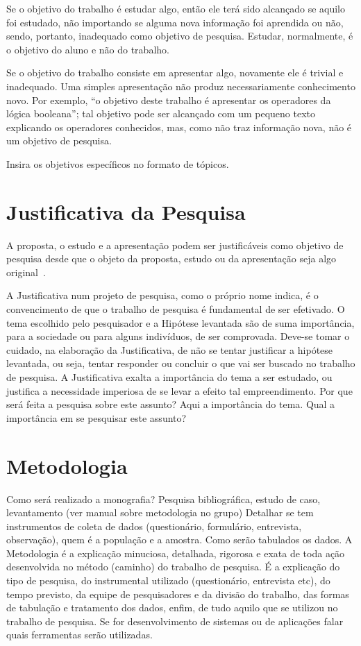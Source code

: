 \documentclass[
	12pt,				    %
	openright,			    %
	oneside,			    %
	a4paper,			    %
    sumario=tradicional,    %
	english,			    %
	brazil,				    %
	]{abntex2}
\begin{document}
Se o objetivo do trabalho é estudar algo, então ele terá sido alcançado se aquilo foi estudado, não importando se alguma nova informação foi aprendida ou não, sendo, portanto, inadequado como objetivo de pesquisa. Estudar, normalmente, é o objetivo do aluno e não do trabalho.

Se o objetivo do trabalho consiste em apresentar algo, novamente ele é trivial e inadequado. Uma simples apresentação não produz necessariamente conhecimento novo. Por exemplo, “o objetivo deste trabalho é apresentar os operadores da lógica booleana”; tal objetivo pode ser alcançado com um pequeno texto explicando os operadores conhecidos, mas, como não traz informação nova, não é um objetivo de pesquisa.

Insira os objetivos específicos no formato de tópicos.

\section{Justificativa da Pesquisa}\label{sec:Justificativa}

A proposta, o estudo e a apresentação podem ser justificáveis como objetivo de pesquisa desde que o objeto da proposta, estudo ou da apresentação seja algo original~\cite{wazlawick2009}.

A Justificativa num projeto de pesquisa, como o próprio nome indica, é o convencimento de que o trabalho de pesquisa é fundamental de ser efetivado. O tema escolhido pelo pesquisador e a Hipótese levantada são de suma importância, para a sociedade ou para alguns indivíduos, de ser comprovada. 
Deve-se tomar o cuidado, na elaboração da Justificativa, de não se tentar justificar a hipótese levantada, ou seja, tentar responder ou concluir o que vai ser buscado no trabalho de pesquisa. A Justificativa exalta a importância do tema a ser estudado, ou justifica a necessidade imperiosa de se levar a efeito tal empreendimento.
Por que será feita a pesquisa sobre este assunto? Aqui a importância do tema. Qual a importância em se pesquisar este assunto?
 

\section{Metodologia}\label{sec:Metodologia}

Como será realizado a monografia? Pesquisa bibliográfica, estudo de caso, levantamento (ver manual sobre metodologia no grupo)
Detalhar se tem instrumentos de coleta de dados (questionário, formulário, entrevista, observação), quem é a população e a amostra. Como serão tabulados os dados.
A Metodologia é a explicação minuciosa, detalhada, rigorosa e exata de toda ação desenvolvida no método (caminho) do trabalho de pesquisa. 
É a explicação do tipo de pesquisa, do instrumental utilizado (questionário, entrevista etc), do tempo previsto, da equipe de pesquisadores e da divisão do trabalho, das formas de tabulação e tratamento dos dados, enfim, de tudo aquilo que se utilizou no trabalho de pesquisa.
Se for desenvolvimento de sistemas ou de aplicações falar quais ferramentas serão utilizadas.
\end{document}
